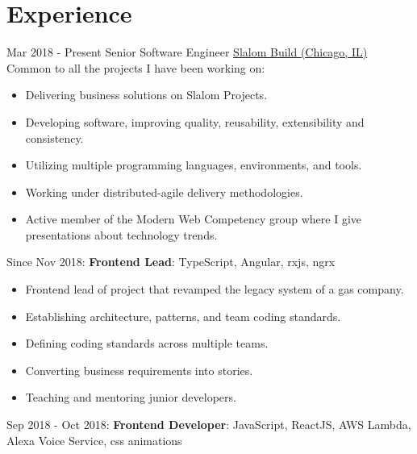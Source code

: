 \documentclass[letterpaper]{template} %
\begin{document}
\makeprofile %


\section{Experience}

\begin{twenty} %
    \twentyitem
    	{Mar 2018 - Present}
		{}
        {Senior Software Engineer}
        {\href{https://www.slalom.com/}{Slalom Build (Chicago, IL)}}
        {Common to all the projects I have been working on:}
        {\begin{itemize}
            \item Delivering business solutions on Slalom Projects.
            \item Developing software, improving quality, reusability, extensibility and consistency.
            \item Utilizing multiple programming languages, environments, and tools.
            \item Working under distributed-agile delivery methodologies.
            \item Active member of the Modern Web Competency group where I give presentations about technology trends.
        \end{itemize}}
    \twentyitem
        {}
        {}
        {}
        {}
        {Since Nov 2018: \textbf{Frontend Lead}: TypeScript, Angular, rxjs, ngrx}
        {\begin{itemize}
            \item Frontend lead of project that revamped the legacy system of a gas company.
            \item Establishing architecture, patterns, and team coding standards.
            \item Defining coding standards across multiple teams.
            \item Converting business requirements into stories.
            \item Teaching and mentoring junior developers.
        \end{itemize}}
    \twentyitem
    	{}
		{}
        {}
        {}
        {Sep 2018 - Oct 2018: \textbf{Frontend Developer}: JavaScript, ReactJS, AWS Lambda, Alexa Voice Service, css animations}

\end{twenty}
\end{document}
